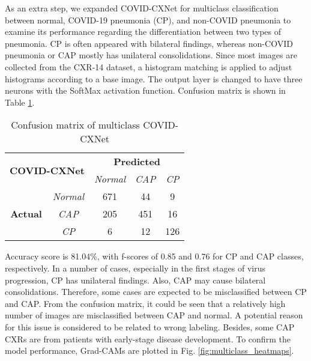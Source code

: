 \documentclass{article}
\begin{document}
As an extra step, we expanded COVID-CXNet for multiclass classification between normal, COVID-19 pneumonia (CP), and non-COVID pneumonia to examine its performance regarding the differentiation between two types of pneumonia. CP is often appeared with bilateral findings, whereas non-COVID pneumonia or CAP mostly has unilateral consolidations. Since most images are collected from the CXR-14 dataset, a histogram matching is applied to adjust histograms according to a base image. The output layer is changed to have three neurons with the SoftMax activation function. Confusion matrix is shown in Table \ref{multi_cxnet_cm}.

\begin{table}[H]
\caption{Confusion matrix of multiclass COVID-CXNet}
\label{multi_cxnet_cm}
\centering
\begin{tabular}{|c|c|c|c|c|}
\hline
\multicolumn{2}{|c|}{\multirow{2}{*}{\textbf{COVID-CXNet}}} & \multicolumn{3}{c|}{\textbf{Predicted}}      \\ \cline{3-5} 
\multicolumn{2}{|c|}{}                                     & \textit{Normal} & \textit{CAP} & \textit{CP} \\ \hline
\multirow{3}{*}{\textbf{Actual}}     & \textit{Normal}     & 671             & 44           & 9           \\ \cline{2-5} 
                                     & \textit{CAP}        & 205             & 451          & 16          \\ \cline{2-5} 
                                     & \textit{CP}         & 6               & 12           & 126         \\ \hline
\end{tabular}
\end{table}

\noindent Accuracy score is 81.04\%, with f-scores of 0.85 and 0.76 for CP and CAP classes, respectively. In a number of cases, especially in the first stages of virus progression, CP has unilateral findings. Also, CAP may cause bilateral consolidations. Therefore, some cases are expected to be misclassified between CP and CAP. From the confusion matrix, it could be seen that a relatively high number of images are misclassified between CAP and normal. A potential reason for this issue is considered to be related to wrong labeling. Besides, some CAP CXRs are from patients with early-stage disease development. To confirm the model performance, Grad-CAMs are plotted in Fig. \ref{fig:multiclass_heatmaps}.
\end{document}
